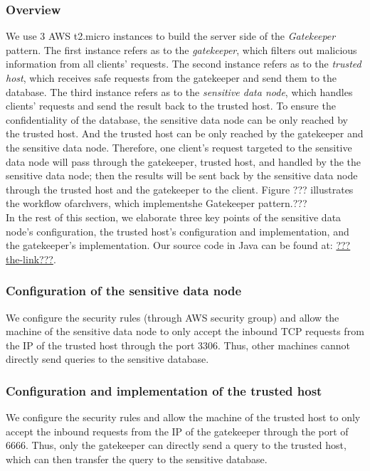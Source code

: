\documentclass{article}
\begin{document}
\subsubsection{Overview}
We use 3 AWS t2.micro instances to build the server side of the \emph{Gatekeeper} pattern. The first instance refers as to the \emph{gatekeeper}, which filters out malicious information from all clients' requests. The second instance refers as to the \emph{trusted host}, which receives safe requests from the gatekeeper and send them to the database. The third instance refers as to the \emph{sensitive data node}, which handles clients' requests and send the result back to the trusted host. To ensure the confidentiality of the database, the sensitive data node can be only reached by the trusted host. And the trusted host can be only reached by the gatekeeper and the sensitive data node. Therefore, one client's request targeted to the sensitive data node will pass through the gatekeeper, trusted host, and handled by the the sensitive data node; then the results will be sent back by the sensitive data node through the trusted host and the gatekeeper to the client. Figure ??? illustrates the workflow ofarchvers, which implementshe Gatekeeper pattern.???\\

In the rest of this section, we elaborate three key points of the sensitive data node's configuration, the trusted host's configuration and implementation, and the gatekeeper's implementation. Our source code in Java can be found at: \url{???the-link???}.

\subsubsection{Configuration of the sensitive data node}
We configure the security rules (through AWS security group) and allow the machine of the sensitive data node to only accept the inbound TCP requests from the IP of the trusted host through the port 3306. Thus, other machines cannot directly send queries to the sensitive database.

\subsubsection{Configuration and implementation of the trusted host}
We configure the security rules and allow the machine of the trusted host to only accept the inbound requests from the IP of the gatekeeper through the port of 6666. Thus, only the gatekeeper can directly send a query to the trusted host, which can then transfer the query to the sensitive database.\\
\end{document}
